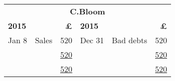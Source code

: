 

\noindent
\begin{tabular}{@{}p{2cm}p{4cm}r|p{2cm}p{4cm}r@{}}
\multicolumn{6}{c}{\textbf{C.Bloom}} \\ \addlinespace[1ex]
\toprule
\textbf{2015} & \multicolumn{1}{l}{\textbf{}} & \textbf{£} & \textbf{2015} & \multicolumn{1}{l}{\textbf{}} & \textbf{£} \\
Jan 8 & Sales & 520 & Dec 31 & Bad debts & 520 \\
& & \underline{520} & & & \underline{520} \\
& & \underline{\underline{520}} & & & \underline{\underline{520}} \\

\end{tabular}

\vspace{1.5cm}
